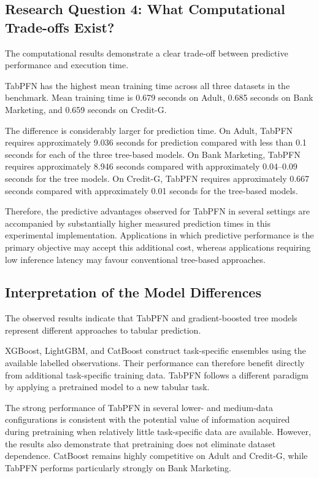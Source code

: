 \subsection{Research Question 4: What Computational Trade-offs Exist?}\label{research-question-4-what-computational-trade-offs-exist}

The computational results demonstrate a clear trade-off between predictive performance and execution time.

TabPFN has the highest mean training time across all three datasets in the benchmark. Mean training time is 0.679 seconds on Adult, 0.685 seconds on Bank Marketing, and 0.659 seconds on Credit-G.

The difference is considerably larger for prediction time. On Adult, TabPFN requires approximately 9.036 seconds for prediction compared with less than 0.1 seconds for each of the three tree-based models. On Bank Marketing, TabPFN requires approximately 8.946 seconds compared with approximately 0.04--0.09 seconds for the tree models. On Credit-G, TabPFN requires approximately 0.667 seconds compared with approximately 0.01 seconds for the tree-based models.

Therefore, the predictive advantages observed for TabPFN in several settings are accompanied by substantially higher measured prediction times in this experimental implementation. Applications in which predictive performance is the primary objective may accept this additional cost, whereas applications requiring low inference latency may favour conventional tree-based approaches.

\subsection{Interpretation of the Model Differences}\label{interpretation-of-the-model-differences}

The observed results indicate that TabPFN and gradient-boosted tree models represent different approaches to tabular prediction.

XGBoost, LightGBM, and CatBoost construct task-specific ensembles using the available labelled observations. Their performance can therefore benefit directly from additional task-specific training data. TabPFN follows a different paradigm by applying a pretrained model to a new tabular task.

The strong performance of TabPFN in several lower- and medium-data configurations is consistent with the potential value of information acquired during pretraining when relatively little task-specific data are available. However, the results also demonstrate that pretraining does not eliminate dataset dependence. CatBoost remains highly competitive on Adult and Credit-G, while TabPFN performs particularly strongly on Bank Marketing.


